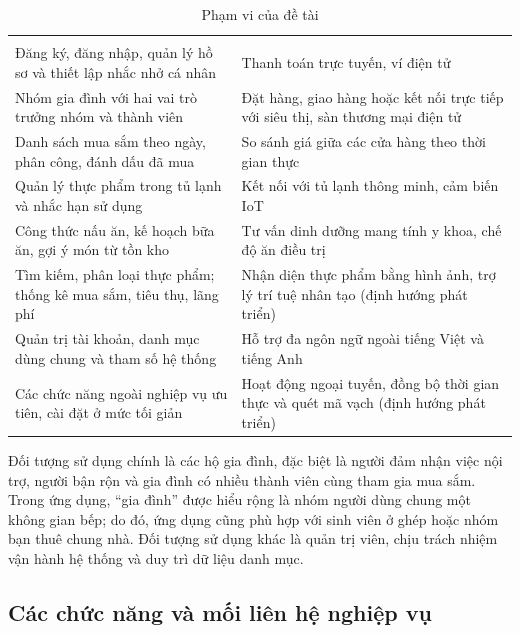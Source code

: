 {\small
\begin{longtable}{|L{0.5\dimexpr{}\arrayrulewidth\relax}|L{0.5\dimexpr{}\arrayrulewidth\relax}|}
\caption{Phạm vi của đề tài}\label{tab:pham-vi}\\
\hline
{} & \\ \hline
\endfirsthead
\hline
{} & \\ \hline
\endhead
Đăng ký, đăng nhập, quản lý hồ sơ và thiết lập nhắc nhở cá nhân & Thanh toán trực tuyến, ví điện tử\\ \hline
Nhóm gia đình với hai vai trò trưởng nhóm và thành viên & Đặt hàng, giao hàng hoặc kết nối trực tiếp với siêu thị, sàn thương mại điện tử\\ \hline
Danh sách mua sắm theo ngày, phân công, đánh dấu đã mua & So sánh giá giữa các cửa hàng theo thời gian thực\\ \hline
Quản lý thực phẩm trong tủ lạnh và nhắc hạn sử dụng & Kết nối với tủ lạnh thông minh, cảm biến IoT\\ \hline
Công thức nấu ăn, kế hoạch bữa ăn, gợi ý món từ tồn kho & Tư vấn dinh dưỡng mang tính y khoa, chế độ ăn điều trị\\ \hline
Tìm kiếm, phân loại thực phẩm; thống kê mua sắm, tiêu thụ, lãng phí & Nhận diện thực phẩm bằng hình ảnh, trợ lý trí tuệ nhân tạo (định hướng phát triển)\\ \hline
Quản trị tài khoản, danh mục dùng chung và tham số hệ thống & Hỗ trợ đa ngôn ngữ ngoài tiếng Việt và tiếng Anh\\ \hline
Các chức năng ngoài nghiệp vụ ưu tiên, cài đặt ở mức tối giản & Hoạt động ngoại tuyến, đồng bộ thời gian thực và quét mã vạch (định hướng phát triển)\\ \hline
\end{longtable}
}

Đối tượng sử dụng chính là các hộ gia đình, đặc biệt là người đảm nhận việc nội trợ, người bận rộn và gia đình có nhiều thành viên cùng tham gia mua sắm. Trong ứng dụng, “gia đình” được hiểu rộng là nhóm người dùng chung một không gian bếp; do đó, ứng dụng cũng phù hợp với sinh viên ở ghép hoặc nhóm bạn thuê chung nhà. Đối tượng sử dụng khác là quản trị viên, chịu trách nhiệm vận hành hệ thống và duy trì dữ liệu danh mục.

\subsection{Các chức năng và mối liên hệ nghiệp vụ}\label{ssec:chuc-nang}

